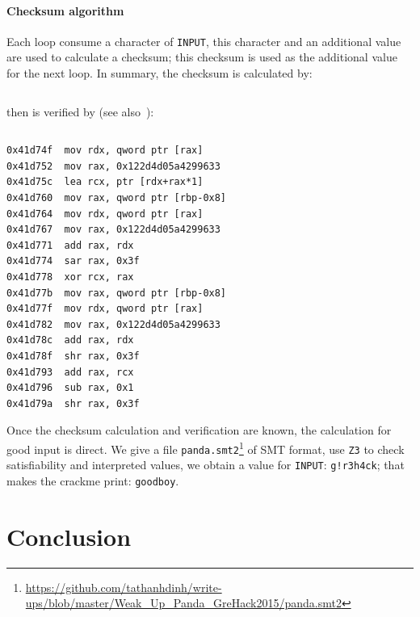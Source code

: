 \documentclass{easychair}
\begin{document}
\paragraph{Checksum algorithm}
Each loop consume a character of \texttt{INPUT}, this character and an additional value are used to calculate a checksum; this checksum is used as the additional value for the next loop. In summary, the checksum is calculated by:
\begin{lstlisting}[frame=lines, caption={Calculating checksum}, captionpos=b, boxpos=b, language={[x86masm]Assembler}, label=lst:checksumcalculation]
\end{lstlisting}
then is verified by (see also~):
\begin{lstlisting}[frame=lines, caption={Verifying checksum}, captionpos=b, boxpos=b, language={[x86masm]Assembler}, label=lst:checksumverification]
\end{lstlisting}

\begin{lstlisting}[frame=lines, caption={Instructions verifying checksum}, captionpos=b, boxpos=b, language={[x86masm]Assembler}, label=lst:checksumverificationcode]
0x41d74f  mov rdx, qword ptr [rax]
0x41d752  mov rax, 0x122d4d05a4299633
0x41d75c  lea rcx, ptr [rdx+rax*1]
0x41d760  mov rax, qword ptr [rbp-0x8]
0x41d764  mov rdx, qword ptr [rax]
0x41d767  mov rax, 0x122d4d05a4299633
0x41d771  add rax, rdx
0x41d774  sar rax, 0x3f
0x41d778  xor rcx, rax
0x41d77b  mov rax, qword ptr [rbp-0x8]
0x41d77f  mov rdx, qword ptr [rax]
0x41d782  mov rax, 0x122d4d05a4299633
0x41d78c  add rax, rdx
0x41d78f  shr rax, 0x3f
0x41d793  add rax, rcx
0x41d796  sub rax, 0x1
0x41d79a  shr rax, 0x3f
\end{lstlisting}

Once the checksum calculation and verification are known, the calculation for good input is direct. We give a file \texttt{panda.smt2}\footnote{\url{https://github.com/tathanhdinh/write-ups/blob/master/Weak\_Up\_Panda\_GreHack2015/panda.smt2}} of SMT format, use \texttt{Z3} to check satisfiability and interpreted values, we obtain a value for \texttt{INPUT}: \texttt{g!r3h4ck}; that makes the crackme print: \texttt{goodboy}.

\section{Conclusion}

\printbibliography
\end{document}

